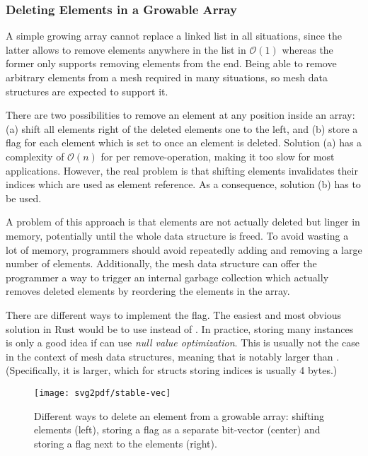 \subsubsection*{Deleting Elements in a Growable Array}

A simple growing array cannot replace a linked list in all situations, since the latter allows to remove elements anywhere in the list in $\mathcal O(1)$ whereas the former only supports removing elements from the end.
Being able to remove arbitrary elements from a mesh required in many situations, so mesh data structures are expected to support it.

There are two possibilities to remove an element at any position inside an array: (a) shift all elements right of the deleted elements one to the left, and (b) store a  flag for each element which is set to  once an element is deleted.
Solution (a) has a complexity of $\mathcal O(n)$ for per remove-operation, making it too slow for most applications.
However, the real problem is that shifting elements invalidates their indices which are used as element reference.
As a consequence, solution (b) has to be used.

A problem of this approach is that elements are not actually deleted but linger in memory, potentially until the whole data structure is freed.
To avoid wasting a lot of memory, programmers should avoid repeatedly adding and removing a large number of elements.
Additionally, the mesh data structure can offer the programmer a way to trigger an internal garbage collection which actually removes deleted elements by reordering the elements in the array.

There are different ways to implement the  flag.
The easiest and most obvious solution in Rust would be to use  instead of .
In practice, storing many  instances is only a good idea if  can use \emph{null value optimization}.
This is usually not the case in the context of mesh data structures, meaning that  is notably larger than .
(Specifically, it is  larger, which for structs storing  indices is usually 4 bytes.)

\begin{figure}[ht]
  \vspace{5mm}
  \centering
  \texttt{[image: svg2pdf/stable-vec]}
  \caption{Different ways to delete an element from a growable array: shifting elements (left), storing a  flag as a separate bit-vector (center) and storing a  flag next to the elements (right).}
  \vspace{5mm}
\end{figure}

